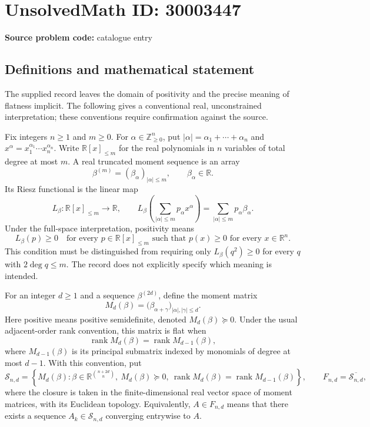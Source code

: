 \documentclass[11pt]{article}
\newcommand{\Z}{\mathbb{Z}}
\newcommand{\R}{\mathbb{R}}
\begin{document}
\section*{UnsolvedMath ID: 30003447}
\textbf{Source problem code:} catalogue entry
\subsection{Definitions and mathematical statement}
The supplied record leaves the domain of positivity and the precise meaning of flatness implicit. The following gives a conventional real, unconstrained interpretation; these conventions require confirmation against the source.

Fix integers \(n\geq 1\) and \(m\geq 0\). For \(\alpha\in\Z_{\geq 0}^{n}\), put \(|\alpha|=\alpha_1+\cdots+\alpha_n\) and \(x^\alpha=x_1^{\alpha_1}\cdots x_n^{\alpha_n}\). Write \(\R[x]_{\leq m}\) for the real polynomials in \(n\) variables of total degree at most \(m\). A real truncated moment sequence is an array
\[
\beta^{(m)}=(\beta_\alpha)_{|\alpha|\leq m},\qquad \beta_\alpha\in\R.
\]
Its Riesz functional is the linear map
\[
L_\beta:\R[x]_{\leq m}\longrightarrow\R,\qquad
L_\beta\!\left(\sum_{|\alpha|\leq m}p_\alpha x^\alpha\right)
=\sum_{|\alpha|\leq m}p_\alpha\beta_\alpha.
\]
Under the full-space interpretation, positivity means
\[
L_\beta(p)\geq 0
\quad\text{for every }p\in\R[x]_{\leq m}
\text{ such that }p(x)\geq 0\text{ for every }x\in\R^n.
\]
This condition must be distinguished from requiring only \(L_\beta(q^2)\geq 0\) for every \(q\) with \(2\deg q\leq m\). The record does not explicitly specify which meaning is intended.

For an integer \(d\geq 1\) and a sequence \(\beta^{(2d)}\), define the moment matrix
\[
M_d(\beta)=\bigl(\beta_{\alpha+\gamma}\bigr)_{|\alpha|,|\gamma|\leq d}.
\]
Here positive means positive semidefinite, denoted \(M_d(\beta)\succeq 0\). Under the usual adjacent-order rank convention, this matrix is flat when
\[
\operatorname{rank}M_d(\beta)=\operatorname{rank}M_{d-1}(\beta),
\]
where \(M_{d-1}(\beta)\) is its principal submatrix indexed by monomials of degree at most \(d-1\). With this convention, put
\[
\mathcal S_{n,d}=\left\{M_d(\beta):
\beta\in\R^{\binom{n+2d}{n}},\ M_d(\beta)\succeq 0,
\ \operatorname{rank}M_d(\beta)=\operatorname{rank}M_{d-1}(\beta)\right\},
\qquad
F_{n,d}=\overline{\mathcal S_{n,d}},
\]
where the closure is taken in the finite-dimensional real vector space of moment matrices, with its Euclidean topology. Equivalently, \(A\in F_{n,d}\) means that there exists a sequence \(A_k\in\mathcal S_{n,d}\) converging entrywise to \(A\).
\end{document}
